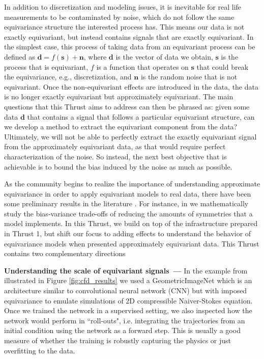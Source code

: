 \documentclass[11pt]{article}
\renewcommand{\paragraph}[1]{\medskip\par\noindent\textbf{#1~---}}
\begin{document}
In addition to discretization and modeling issues, it is inevitable for real life measurements to be contaminated by noise, which do not follow the same equivariance structure the interested process has. This means our data is not exactly equivariant, but instead contains signals that are exactly equivariant. In the simplest case, this process of taking data from an equivariant process can be defined as $\mathbf{d} = f(\mathbf{s}) + \mathbf{n}$, where $\mathbf{d}$ is the vector of data we obtain, $\mathbf{s}$ is the process that is equivariant, $f$ is a function that operates on $\mathbf{s}$ that could break the equivariance, e.g., discretization, and $\mathbf{n}$ is the random noise that is not equivariant.
Once the non-equivariant effects are introduced in the data, the data is no longer exactly equivariant but approximately equivariant.
The main questions that this Thrust aims to address can then be phrased as: given some data $\mathbf{d}$ that contains a signal that follows a particular equivariant structure, can we develop a method to extract the equivariant component from the data? Ultimately, we will not be able to perfectly extract the exactly equivariant signal from the approximately equivariant data, as that would require perfect characterization of the noise. So instead, the next best objective that is achievable is to bound the bias induced by the noise as much as possible. 

As the community begins to realize the importance of understanding approximate equivariance in order to apply equivariant models to real data, there have been some preliminary results in the literature \cite{Wang2022ApproximatelyEN, huang2021traffic}. For instance, in \cite{huang2024approximately} we mathematically study the bias-variance trade-offs of reducing the amounts of symmetries that a model implements. 
In this Thrust, we build on top of the infrastructure prepared in Thrust 1, but shift our focus to adding effects to understand the behavior of equivariance models when presented approximately equivariant data. This Thrust contains two complementary directions  

\paragraph{Understanding the scale of equivariant signals}
In the example from \cite{gregory2024robust} illustrated in Figure \ref{fig:cfd_results} we used a GeometricImageNet which is an architecture similar to convolutional neural network (CNN) but with imposed equivariance to emulate simulations of 2D compressible Naiver-Stokes equation. Once we trained the network in a supervised setting, we also inspected how the network would perform in ``roll-outs", i.e. integrating the trajectories from an initial condition using the network as a forward step. This is usually a good measure of whether the training is robustly capturing the physics or just overfitting to the data.
\end{document}

